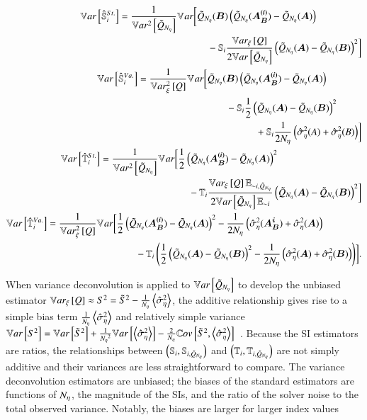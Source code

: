 \begin{align} \label{m4eq:var-s-stan}
\begin{split}
    \mathbb{V}ar\left[\hat{\mathbb{S}}_{i}^{St.}\right] &= \frac{1}{\mathbb{V}ar^2\left[\tilde{Q}_{{N_\eta}}\right]} \mathbb{V}_{}ar \biggl[\tilde{Q}_{{N_\eta}}(\bm{B}) \left( \tilde{Q}_{{N_\eta}}(\bm{A_B^{(i)}}) - \tilde{Q}_{{N_\eta}}(\bm{A}) \right) \\
    &\qquad \qquad \qquad \qquad \quad  - \mathbb{S}_{i} \frac{\mathbb{V}ar_{\xi}\left[Q\right]}{2\mathbb{V}ar\left[\tilde{Q}_{{N_\eta}}\right]} \left( \tilde{Q}_{{N_\eta}}(\bm{A}) - \tilde{Q}_{{N_\eta}}(\bm{B}) \right)^2 \biggr]
\end{split} \\ \label{m4eq:var-s-vd}
\begin{split}
    \mathbb{V}ar\left[\hat{\mathbb{S}}_{i}^{Va.}\right] &= \frac{1}{\mathbb{V}ar^2_{\xi}\left[Q\right]} \mathbb{V}_{} ar \biggl[\tilde{Q}_{{N_\eta}}(\bm{B}) \left( \tilde{Q}_{{N_\eta}}(\bm{A_B^{(i)}}) - \tilde{Q}_{{N_\eta}}(\bm{A}) \right) \\
    &\qquad \qquad \qquad \qquad \quad - \mathbb{S}_{i} \frac{1}{2} \left( \tilde{Q}_{{N_\eta}}(\bm{A}) - \tilde{Q}_{{N_\eta}}(\bm{B}) \right)^2 \\
    &\qquad \qquad \qquad \qquad \qquad \qquad + \mathbb{S}_{i} \frac{1}{2{N_\eta}} \left( \hat{\sigma}^2_\eta(A) + \hat{\sigma}^2_\eta(B) \right) \biggr]
\end{split} \\ \label{m4eq:var-t-stan}
\begin{split}
    \mathbb{V}ar\left[\hat{\mathbb{T}}_{i}^{St.}\right] &= \frac{1}{\mathbb{V}ar^2\left[\tilde{Q}_{{N_\eta}}\right]} \mathbb{V}_{} ar \biggl[\frac{1}{2} \left( \tilde{Q}_{{N_\eta}}(\bm{A_B^{(i)}}) - \tilde{Q}_{{N_\eta}}(\bm{A}) \right)^2 \\
    &\qquad \qquad \qquad \qquad \quad - \mathbb{T}_{i} \frac{\mathbb{V}ar_{\xi}\left[Q\right] \mathbb{E}_{{\sim i}, \tilde{Q}_{{N_\eta}}}}{2\mathbb{V}ar\left[\tilde{Q}_{{N_\eta}}\right] \mathbb{E}_{{\sim i}}} \left( \tilde{Q}_{{N_\eta}}(\bm{A}) - \tilde{Q}_{{N_\eta}}(\bm{B}) \right)^2 \biggr] 
\end{split} \\ \label{m4eq:var-t-vd}
\begin{split}
    \mathbb{V}ar\left[\hat{\mathbb{T}}_{i}^{Va.}\right] &= \frac{1}{\mathbb{V}ar^2_{\xi}\left[Q\right]} \mathbb{V}_{} ar \biggl[\frac{1}{2} \left( \tilde{Q}_{{N_\eta}}(\bm{A_B^{(i)}}) - \tilde{Q}_{{N_\eta}}(\bm{A}) \right)^2 - \frac{1}{2{N_\eta}} \left( \hat{\sigma}^2_\eta(\bm{A_B^i}) + \hat{\sigma}^2_\eta(\bm{A}) \right) \\
    &\qquad \qquad \qquad \qquad \quad - \mathbb{T}_{i} \left( \frac{1}{2} \left( \tilde{Q}_{{N_\eta}}(\bm{A}) - \tilde{Q}_{{N_\eta}}(\bm{B}) \right)^2 - \frac{1}{2{N_\eta}} \left( \hat{\sigma}^2_\eta(\bm{A}) + \hat{\sigma}^2_\eta(\bm{B}) \right) \right) \biggr].
\end{split}
\end{align}

When variance deconvolution is applied to $\mathbb{V}ar\left[\tilde{Q}_{{N_\eta}}\right]$ to develop the unbiased estimator $\mathbb{V}ar_{\xi}\left[Q\right] \approx S^2 = \tilde{S}^2 - \frac{1}{{N_\eta}}\left< \hat{\sigma}^2_\eta \right>$, the additive relationship gives rise to a simple bias term $\frac{1}{{N_\eta}}\left< \hat{\sigma}^2_\eta \right>$ and relatively simple variance $\mathbb{V}ar\left[S^2\right] = \mathbb{V}ar\left[\tilde{S}^2\right] + \frac{1}{{N_\eta}^2} \mathbb{V}ar\left[\left< \hat{\sigma}^2_\eta \right>\right] - \frac{2}{{N_\eta}} \mathbb{C}ov\left[\tilde{S}^2,\left< \hat{\sigma}^2_\eta \right>\right]$~\cite{clements-etal-2024}.
Because the SI estimators are ratios, the relationships between $\left(\mathbb{S}_{i},\mathbb{S}_{i, \tilde{Q}_{{N_\eta}}}\right)$ and $\left(\mathbb{T}_{i},\mathbb{T}_{i, \tilde{Q}_{{N_\eta}}}\right)$ are not simply additive and their variances are less straightforward to compare.
The variance deconvolution estimators are unbiased; the biases of the standard estimators are functions of ${N_\eta}$, the magnitude of the SIs, and the ratio of the solver noise to the total observed variance.
Notably, the biases are larger for larger index values

